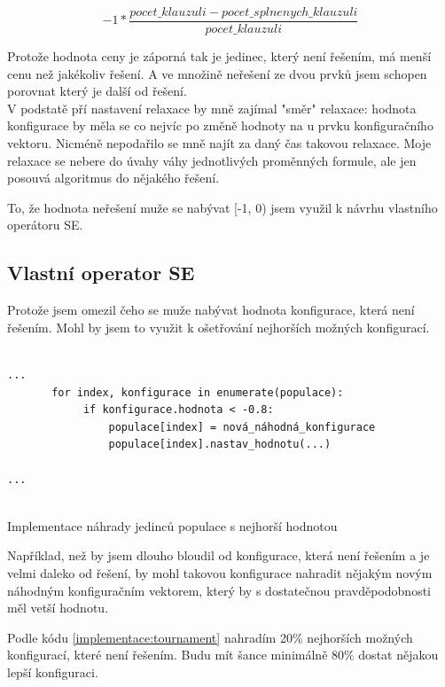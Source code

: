 \documentclass{article}
\begin{document}
\[ -1 * \frac{pocet\_klauzuli - pocet\_splnenych\_klauzuli}{pocet\_klauzuli}\]

Protože hodnota ceny je záporná tak je jedinec, který není řešením, má menší cenu než jakékoliv řešení. A ve množině neřešení ze dvou prvků jsem schopen porovnat který je další od řešení.\\

V podstatě pří nastavení relaxace by mně zajímal "směr" relaxace: hodnota konfigurace by měla se  co nejvíc po změně hodnoty na  u  prvku konfiguračního vektoru. Nicméně nepodařilo se mně najít za daný čas takovou relaxace. Moje relaxace se nebere do úvahy váhy jednotlivých proměnných formule, ale jen posouvá algoritmus do nějakého řešení.

To, že hodnota neřešení muže se nabývat [-1, 0) jsem využil k návrhu vlastního operátoru SE.

\subsection{Vlastní operator SE}

Protože jsem omezil čeho se muže nabývat hodnota konfigurace, která není řešením. Mohl by jsem to využit k ošetřování nejhorších možných konfigurací.

\begin{listing}[H]
\begin{verbatim}
        
...        
       for index, konfigurace in enumerate(populace):
            if konfigurace.hodnota < -0.8:
                populace[index] = nová_náhodná_konfigurace
                populace[index].nastav_hodnotu(...)

...
               
\end{verbatim}
\caption{Implementace náhrady jedinců populace s nejhorší hodnotou}
\label{implementace:tournament}
\end{listing}

Například, než by jsem dlouho bloudil od konfigurace, která není řešením a je velmi daleko od řešení, by mohl takovou konfigurace nahradit nějakým novým náhodným konfiguračním vektorem, který by s dostatečnou pravděpodobnosti měl vetší hodnotu.

Podle kódu \ref{implementace:tournament} nahradím 20\% nejhorších možných konfigurací, které není řešením. Budu mít šance minimálně 80\% dostat nějakou lepší konfiguraci.
\end{document}
